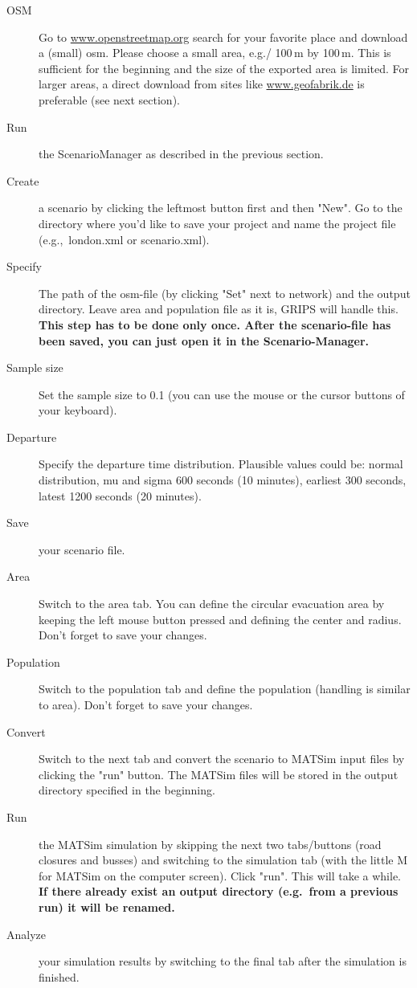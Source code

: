 \begin{description}
\item[OSM] Go to \url{www.openstreetmap.org} search for your favorite place and download a (small) osm. Please choose a small area, e.g./ 100\,m by 100\,m. This is sufficient for the beginning and the size of the exported area is limited. For larger areas, a direct download from sites like \url{www.geofabrik.de} is preferable (see next section).
\item[Run] the ScenarioManager as described in the previous section.
\item[Create] a scenario by clicking the leftmost button first and then "New". Go to the directory where you'd like to save your project and name the project file (e.g.,\, london.xml or scenario.xml).
\item[Specify] The path of the osm-file (by clicking "Set" next to network) and the output directory. Leave area and population file as it is, GRIPS will handle this.
\textbf{This step has to be done only once. After the scenario-file has been saved, you can just open it in the Scenario-Manager.}
\item[Sample size] Set the sample size to 0.1 (you can use the mouse or the cursor buttons of your keyboard).
\item[Departure] Specify the departure time distribution. Plausible values could be: normal distribution, mu and sigma 600 seconds (10 minutes), earliest 300 seconds, latest 1200 seconds (20 minutes).
\item[Save] your scenario file.
\item[Area] Switch to the area tab. You can define the circular evacuation area by keeping the left mouse button pressed and defining the center and radius. Don't forget to save your changes.
\item[Population] Switch to the population tab and define the population (handling is similar to area). Don't forget to save your changes.
\item[Convert] Switch to the next tab and convert the scenario to MATSim input files by clicking the "run" button. The MATSim files will be stored in the output directory specified in the beginning.
\item[Run] the MATSim simulation by skipping the next two tabs/buttons (road closures and busses) and switching to the simulation tab (with the little M for MATSim on the computer screen). Click "run". This will take a while.
\textbf{If there already exist an output directory (e.g.\ from a previous run) it will be renamed.}
\item[Analyze] your simulation results by switching to the final tab after the simulation is finished.

\end{description}

